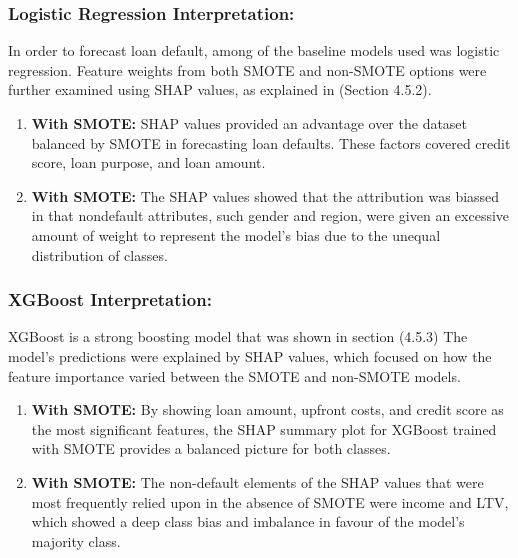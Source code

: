 \documentclass[12pt, a4paper,oneside]{book}
\numberwithin{equation}{section}
\begin{document}
\subsubsection{ Logistic Regression Interpretation:}
In order to forecast loan default, among of the baseline models used was logistic regression. Feature weights from both SMOTE and non-SMOTE options were further examined using SHAP values, as explained in (Section 4.5.2).

\begin{enumerate}
     \item\textbf{With SMOTE:} \newline
     SHAP values provided an advantage over the dataset balanced by SMOTE in forecasting loan defaults. These factors covered credit score, loan purpose, and loan amount.
     
     \item\textbf{With SMOTE:} \newline
     The SHAP values showed that the attribution was biassed in that nondefault attributes, such gender and region, were given an excessive amount of weight to represent the model's bias due to the unequal distribution of classes.
\end{enumerate}

\subsubsection{XGBoost Interpretation:}

XGBoost is a strong boosting model that was shown in section (4.5.3) The model's predictions were explained by SHAP values, which focused on how the feature importance varied between the SMOTE and non-SMOTE models.

\begin{enumerate}
   \item\textbf{With SMOTE:} \newline
    By showing loan amount, upfront costs, and credit score as the most significant features, the SHAP summary plot for XGBoost trained with SMOTE provides a balanced picture for both classes.

   \item\textbf{With SMOTE:} \newline
    The non-default elements of the SHAP values that were most frequently relied upon in the absence of SMOTE were income and LTV, which showed a deep class bias and imbalance in favour of the model's majority class.
\end{enumerate}
\end{document}
